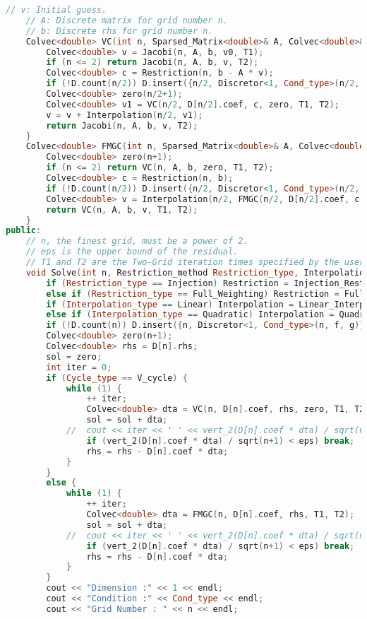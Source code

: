 \documentclass{ctexart}
\begin{document}
\begin{lstlisting}[language=c++]
	// v: Initial guess.
	// A: Discrete matrix for grid number n.
	// b: Discrete rhs for grid number n. 
	Colvec<double> VC(int n, Sparsed_Matrix<double>& A, Colvec<double>& b, Colvec<double>& v0, int T1, int T2) {
		Colvec<double> v = Jacobi(n, A, b, v0, T1);
		if (n <= 2) return Jacobi(n, A, b, v, T2);
		Colvec<double> c = Restriction(n, b - A * v);
		if (!D.count(n/2)) D.insert({n/2, Discretor<1, Cond_type>(n/2, f, g)});
		Colvec<double> zero(n/2+1);
		Colvec<double> v1 = VC(n/2, D[n/2].coef, c, zero, T1, T2);
		v = v + Interpolation(n/2, v1);
		return Jacobi(n, A, b, v, T2);
	}
	Colvec<double> FMGC(int n, Sparsed_Matrix<double>& A, Colvec<double>& b, int T1, int T2) {
		Colvec<double> zero(n+1);
		if (n <= 2) return VC(n, A, b, zero, T1, T2);
		Colvec<double> c = Restriction(n, b);
		if (!D.count(n/2)) D.insert({n/2, Discretor<1, Cond_type>(n/2, f, g)});
		Colvec<double> v = Interpolation(n/2, FMGC(n/2, D[n/2].coef, c, T1, T2));
		return VC(n, A, b, v, T1, T2);
	}
public:
	// n, the finest grid, must be a power of 2.
	// eps is the upper bound of the residual.
	// T1 and T2 are the Two-Grid iteration times specified by the user.
	void Solve(int n, Restriction_method Restriction_type, Interpolation_method Interpolation_type, Cycle_method Cycle_type, int T1 = 5, int T2 = 5, double eps = 1e-8, bool is_test = 0, const Function<double>& real = _0<double>()) {
		if (Restriction_type == Injection) Restriction = Injection_Restriction_1D;
		else if (Restriction_type == Full_Weighting) Restriction = Full_Weighting_Restriction_1D;
		if (Interpolation_type == Linear) Interpolation = Linear_Interpolation_1D;
		else if (Interpolation_type == Quadratic) Interpolation = Quadratic_Interpolation_1D;
		if (!D.count(n)) D.insert({n, Discretor<1, Cond_type>(n, f, g)});
		Colvec<double> zero(n+1);
		Colvec<double> rhs = D[n].rhs;
		sol = zero;
		int iter = 0;
		if (Cycle_type == V_cycle) {
			while (1) {
				++ iter;
				Colvec<double> dta = VC(n, D[n].coef, rhs, zero, T1, T2);
				sol = sol + dta;
			//	cout << iter << ' ' << vert_2(D[n].coef * dta) / sqrt(n+1) << endl;
				if (vert_2(D[n].coef * dta) / sqrt(n+1) < eps) break;
				rhs = rhs - D[n].coef * dta;
			}
		}
		else {
			while (1) {
				++ iter;
				Colvec<double> dta = FMGC(n, D[n].coef, rhs, T1, T2);
				sol = sol + dta;
			//	cout << iter << ' ' << vert_2(D[n].coef * dta) / sqrt(n+1) << endl;
				if (vert_2(D[n].coef * dta) / sqrt(n+1) < eps) break;
				rhs = rhs - D[n].coef * dta;
			}
		}
		cout << "Dimension :" << 1 << endl;
		cout << "Condition :" << Cond_type << endl;
		cout << "Grid Number : " << n << endl;

\end{lstlisting}
\end{document}
